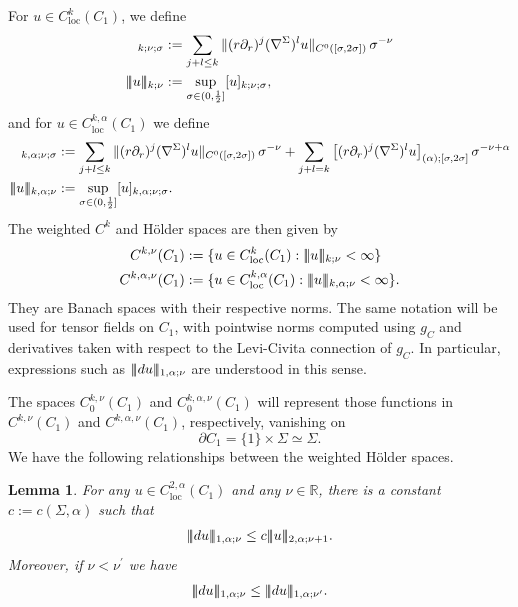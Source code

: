\documentclass[11pt]{amsart}
\DeclarePairedDelimiter{\tnorm}{\vert\!\vert\!\vert}{\vert\!\vert\!\vert}
\newtheorem{lemma}{Lemma}
\theoremstyle{definition}
\theoremstyle{remark}
\newcommand{\R}{\mathbb{R}}
\begin{document}
For $u \in C_{\text{loc}}^{k}(C_1)$, we define
\begin{align*}
    [u]_{k;\nu;\sigma} &:= \sum_{j + l \leq k}\|(r\partial_r)^j (\nabla^\Sigma)^l u\|_{C^0([\sigma, 2\sigma])} \, \sigma^{-\nu}\\
    \tnorm{u}_{k;\nu} &:= \sup_{\sigma \in (0,\frac{1}{2}]} [u]_{k;\nu;\sigma},
\end{align*}
and for $u \in C_{\text{loc}}^{k,\alpha}(C_1)$ we define
\begin{align*}
    [u]_{k,\alpha;\nu;\sigma} &:= \sum_{j + l \leq k}\|(r\partial_r)^j (\nabla^\Sigma)^l u\|_{C^0([\sigma, 2\sigma])} \, \sigma^{-\nu} + \sum_{j + l = k}\big[(r\partial_r)^j(\nabla^\Sigma)^lu\big]_{(\alpha); [\sigma,2\sigma]} \, \sigma^{-\nu + \alpha}\\
    \tnorm{u}_{k,\alpha;\nu} &:= \sup_{\sigma \in (0,\frac{1}{2}]} [u]_{k,\alpha;\nu;\sigma}.
\end{align*}
The weighted $C^k$ and H\"older spaces are then given by
\begin{align*}
    C^{k,\nu}(C_1) &:= \{u \in C_{\text{loc}}^k(C_1) : \tnorm{u}_{k;\nu} < \infty\} \\
    C^{k,\alpha, \nu}(C_1) &:= \{u \in C_{\text{loc}}^{k,\alpha}(C_1) : \tnorm{u}_{k,\alpha;\nu} < \infty\}.
\end{align*}
They are Banach spaces with their respective norms.
The same notation will be used for tensor fields on \(C_1\), with pointwise
norms computed using \(g_C\) and derivatives taken with respect to the
Levi-Civita connection of \(g_C\). In particular, expressions such as
\(\tnorm{du}_{1,\alpha;\nu}\) are understood in this sense.

The spaces $C_0^{k,\nu}(C_1)$ and $C_0^{k,\alpha,\nu}(C_1)$ will represent those functions in $C^{k,\nu}(C_1)$ and $C^{k,\alpha,\nu}(C_1)$, respectively, vanishing on \[\partial C_1 = \{1\} \times \Sigma \simeq \Sigma.\] 
We have the following relationships between the weighted H\"older spaces. 
\begin{lemma}\label{lem:derivative-weight}
For any $u\in C^{2,\alpha}_{\text{loc}}(C_{1})$ and any $\nu\in\R$, there is a constant $c:= c(\Sigma,\alpha)$ such that
\begin{align}\label{eq: est-fist-second-der}  
\tnorm{du}_{1,\alpha;\nu}\le c\tnorm{u}_{2,\alpha;\nu+1}.
\end{align}
Moreover, if $\nu<\nu^\prime$ we have
\begin{align}\label{eq: comparison-exponents}
\tnorm{du}_{1,\alpha;\nu}\le \tnorm{du}_{1,\alpha;\nu^\prime}.
\end{align}
\end{lemma}
\end{document}
